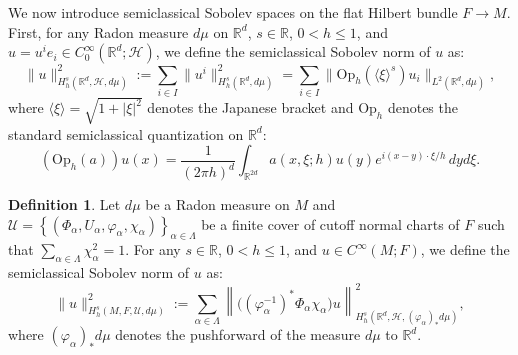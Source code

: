 \documentclass[11pt,oneside,reqno]{amsart}
\newcommand\R{\ensuremath{\mathbb{R}}}
\newcommand\Oph{\ensuremath{\mathrm{Op}_h}}
\theoremstyle{definition}
\newtheorem{definition}{Definition}[section]
\numberwithin{equation}{section}
\theoremstyle{plain}
\begin{document}
We now introduce semiclassical Sobolev spaces on the flat Hilbert bundle $F\rightarrow M$. First, for any Radon measure $d\mu$ on $\R^d$, $s\in \mathbb{R}$, $0<h\leq 1$, and $u =   u^{i} e_{i}\in C_0^\infty(\mathbb{R}^d;\mathcal{H})$, we define the semiclassical Sobolev norm of $u$ as:
\begin{equation*}
    \|u\|^2_{H^{s}_{h}(\R^d,\mathcal{H},d\mu)} :=\sum_{i\in I}\|u^{i}\|^2_{H^{s}_{h}(\R^d,d\mu)}=\sum_{i\in I}\|\Oph(\langle \xi\rangle^s)u_{i}\|_{L^2(\R^d,d\mu)}, 
\end{equation*}
where $\langle \xi\rangle= \sqrt{1+|\xi|^2}$ denotes the Japanese bracket and $\Oph$ denotes the standard semiclassical quantization on $\mathbb{R}^d$:
\begin{equation}\label{standquant}
    (\Oph(a) ) u(x)= \frac{1}{(2\pi h)^d} \int_{\mathbb{R}^{2d}} a(x,\xi;h ) u(y) e^{i(x-y)\cdot \xi/h} \,dyd\xi.
\end{equation}

\begin{definition}\label{def:sobolev}
    Let $d\mu$ be a Radon measure on $M$ and $\mathcal{U}=\left\{\left(\Phi_{\alpha}, U_{\alpha}, \varphi_{\alpha},\chi_{\alpha}\right)\right\}_{\alpha\in \Lambda}$ be a finite cover of cutoff normal charts of $F$ such that $\sum_{\alpha\in \Lambda}\chi_{\alpha}^2=1$. For any $s \in \mathbb{R}$, $0<h\leq 1$, and $u \in C^{\infty}(M; F)$, we define the semiclassical Sobolev norm of $u$ as:
\begin{equation}\label{defofsobolevnorm}
\|u\|_{H_h^s(M, F,\mathcal{U},d\mu)}^2:=\sum_{\alpha\in \Lambda}\left\|\big((\varphi_{\alpha}^{-1})^*\Phi_{\alpha}\chi_{\alpha}\big)u\right\|_{H_h^s(\R^d,  \mathcal{H},(\varphi_{\alpha})_{*}d\mu)}^2,
\end{equation}
where $(\varphi_{\alpha})_{*}d\mu$ denotes the pushforward of the measure $d\mu$ to $\R^d$.
\end{definition}

\end{document}
